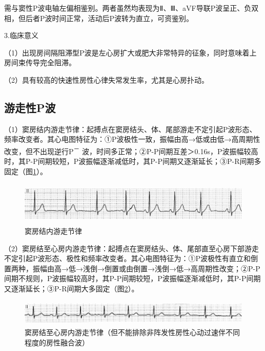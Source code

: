 需与窦性P波电轴左偏相鉴别。两者虽然均表现为Ⅱ、Ⅲ、aVF导联P波呈正、负双相，但后者P波时间正常，活动后P波转为直立，可资鉴别。

3.临床意义

（1）出现房间隔阻滞型P波是左心房扩大或肥大非常特异的征象，同时意味着上房间束传导完全阻滞。

（2）具有较高的快速性房性心律失常发生率，尤其是心房扑动。

\protect\hypertarget{text00007.htmlux5cux23subid12}{}{}

\subsection{游走性P波}

（1）窦房结内游走节律：起搏点在窦房结头、体、尾部游走不定引起P波形态、频率改变者。其心电图特征为：①P波极性一致，振幅由高→低或由低→高周期性改变，但不出现逆行P\textsuperscript{－}
波，时间多正常；②P-P间期互差＞0.16s，P波振幅较高时，其P-P间期较短，P波振幅逐渐减低时，其P-P间期又逐渐延长；③P-R间期多固定（图\ref{fig1-12}）。

\begin{figure}[!htbp]
 \centering
 \includegraphics[width=5.78125in,height=0.8125in]{./images/Image00018.jpg}
 \captionsetup{justification=centering}
 \caption{窦房结内游走节律}
 \label{fig1-12}
  \end{figure} 

（2）窦房结至心房内游走节律：起搏点在窦房结头、体、尾部直至心房下部游走不定引起P波形态、极性和频率改变者。其心电图特征为：①P波极性有直立和倒置两种，振幅由高→低→浅倒→倒置或由倒置→浅倒→低→高周期性改变；②P-P间期不规则，P波振幅较高时，其P-P间期较短，P波振幅逐渐减低时，其P-P间期又逐渐延长；③P-R间期大多固定（图\ref{fig1-13}）。

\begin{figure}[!htbp]
 \centering
 \includegraphics[width=5.78125in,height=0.48958in]{./images/Image00019.jpg}
 \captionsetup{justification=centering}
 \caption{窦房结至心房内游走节律（但不能排除非阵发性房性心动过速伴不同程度的房性融合波）}
 \label{fig1-13}
  \end{figure} 

